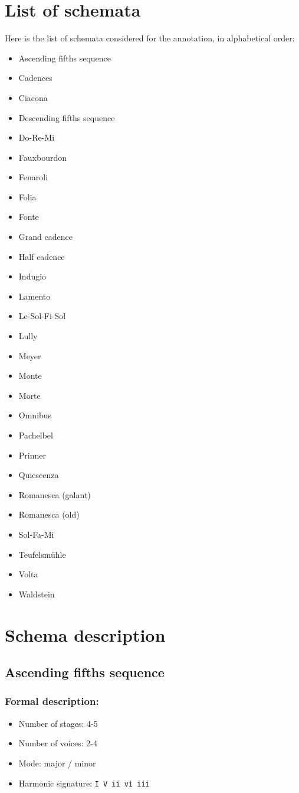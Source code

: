 ﻿\documentclass[11pt, openany]{article}
\begin{document}
\section{List of schemata}
Here is the list of schemata considered for the annotation, in alphabetical order:
\begin{itemize}
    \setlength\itemsep{1pt}
\item Ascending fifths sequence
\item Cadences
\item Ciacona
\item Descending fifths sequence
\item Do-Re-Mi
\item Fauxbourdon
\item Fenaroli
\item Folia
\item Fonte
\item Grand cadence
\item Half cadence
\item Indugio
\item Lamento
\item Le-Sol-Fi-Sol
\item Lully
\item Meyer
\item Monte
\item Morte
\item Omnibus
\item Pachelbel
\item Prinner
\item Quiescenza
\item Romanesca (galant)
\item Romanesca (old)
\item Sol-Fa-Mi
\item Teufelsmühle
\item Volta
\item Waldstein
\end{itemize}


\section{Schema description}


	\subsection{Ascending fifths sequence}
	
\subsubsection{Formal description:}
\begin{itemize}
\item Number of stages: 4-5
\item Number of voices: 2-4
\item Mode: major / minor
\item Harmonic signature: \texttt{I V ii vi iii}
\end{itemize}
\end{document}
